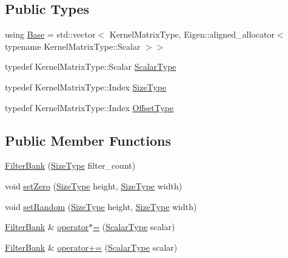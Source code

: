 \subsection*{Public Types}
\begin{DoxyCompactItemize}
\item 
using \hyperlink{classffnn_1_1layer_1_1_filter_bank_a57f78a46d30b55129334593d977d8c10}{Base} = std\-::vector$<$ Kernel\-Matrix\-Type, Eigen\-::aligned\-\_\-allocator$<$ typename Kernel\-Matrix\-Type\-::\-Scalar $>$$>$
\item 
typedef Kernel\-Matrix\-Type\-::\-Scalar \hyperlink{classffnn_1_1layer_1_1_filter_bank_a9520eb8417c9c124f33c1136d40842d4}{Scalar\-Type}
\item 
typedef Kernel\-Matrix\-Type\-::\-Index \hyperlink{classffnn_1_1layer_1_1_filter_bank_afd78272ebca97ce2f34596ffb9dc6cd9}{Size\-Type}
\item 
typedef Kernel\-Matrix\-Type\-::\-Index \hyperlink{classffnn_1_1layer_1_1_filter_bank_a87d15738c0864b171f2b605af7330432}{Offset\-Type}
\end{DoxyCompactItemize}
\subsection*{Public Member Functions}
\begin{DoxyCompactItemize}
\item 
\hyperlink{classffnn_1_1layer_1_1_filter_bank_a5b057c2a52caabd6b53e9398c2969318}{Filter\-Bank} (\hyperlink{classffnn_1_1layer_1_1_filter_bank_afd78272ebca97ce2f34596ffb9dc6cd9}{Size\-Type} filter\-\_\-count)
\item 
void \hyperlink{classffnn_1_1layer_1_1_filter_bank_ae72e590b79040f0a420d87167e6f313e}{set\-Zero} (\hyperlink{classffnn_1_1layer_1_1_filter_bank_afd78272ebca97ce2f34596ffb9dc6cd9}{Size\-Type} height, \hyperlink{classffnn_1_1layer_1_1_filter_bank_afd78272ebca97ce2f34596ffb9dc6cd9}{Size\-Type} width)
\item 
void \hyperlink{classffnn_1_1layer_1_1_filter_bank_a3cdf8172fc5ccd23f6a0f08473372f5e}{set\-Random} (\hyperlink{classffnn_1_1layer_1_1_filter_bank_afd78272ebca97ce2f34596ffb9dc6cd9}{Size\-Type} height, \hyperlink{classffnn_1_1layer_1_1_filter_bank_afd78272ebca97ce2f34596ffb9dc6cd9}{Size\-Type} width)
\item 
\hyperlink{classffnn_1_1layer_1_1_filter_bank}{Filter\-Bank} \& \hyperlink{classffnn_1_1layer_1_1_filter_bank_aefb499d343c3e36126e3337752f3f8e8}{operator$\ast$=} (\hyperlink{classffnn_1_1layer_1_1_filter_bank_a9520eb8417c9c124f33c1136d40842d4}{Scalar\-Type} scalar)
\item 
\hyperlink{classffnn_1_1layer_1_1_filter_bank}{Filter\-Bank} \& \hyperlink{classffnn_1_1layer_1_1_filter_bank_af2b30e023be802fad63a26512c138fe6}{operator+=} (\hyperlink{classffnn_1_1layer_1_1_filter_bank_a9520eb8417c9c124f33c1136d40842d4}{Scalar\-Type} scalar)
\end{DoxyCompactItemize}



